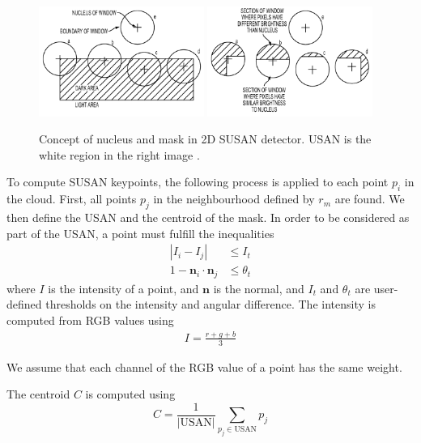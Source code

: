 \documentclass[11pt,a4paper]{kth-mag}
\begin{document}
\begin{figure}
  \centering
  \includegraphics[width=0.48\textwidth]{images/susan1}
  \includegraphics[width=0.48\textwidth]{images/susan}
  \caption{Concept of nucleus and mask in 2D SUSAN detector. USAN is the white
    region in the right image \cite{zhang2013susan}.}
  \label{fig:susan_nucleus}
\end{figure}

To compute SUSAN keypoints, the following process is applied to each point $p_i$
in the cloud. First, all points $p_j$ in the neighbourhood defined by $r_m$ are
found. We then define the USAN and the centroid of the mask. In order to be
considered as part of the USAN, a point must fulfill the inequalities
\begin{align}
  \label{eq:9}
  \left|I_i-I_j\right|&\leq I_t\\
  1-\mathbf{n}_i\cdot\mathbf{n}_j&\leq \theta_t
\end{align}
where $I$ is the intensity of a point, and $\mathbf{n}$ is the normal, and $I_t$
and $\theta_t$ are user-defined thresholds on the intensity and angular
difference. The intensity is computed from RGB values using
\begin{align}
  \label{eq:10}
  I=\frac{r+g+b}{3}
\end{align}

We assume that each channel of the RGB value of a point has the same weight.

The centroid $C$ is computed using
\begin{equation}
  \label{eq:11}
  C=\frac{1}{\left|\text{USAN}\right|}\sum_{p_j \in \text{USAN}}p_j
\end{equation}
\end{document}
